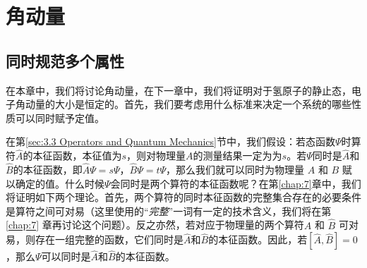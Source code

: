 \chapter{角动量}
\label{chap:5}
\section{同时规范多个属性}
\label{sec:5.1 Simultaneous Specification of Several Properties}
    在本章中，我们将讨论角动量，在下一章中，我们将证明对于氢原子的静止态，电子角动量的大小是恒定的。首先，我们要考虑用什么标准来决定一个系统的哪些性质可以同时赋予定值。

    在第\ref{sec:3.3 Operators and Quantum Mechanics}节中，我们假设：若态函数$\Psi$时算符$\hat{A}$的本征函数，本征值为$s$，则对物理量$A$的测量结果一定为为$s$。若$\Psi$同时是$\hat{A}$和$\hat{B}$的本征函数，即$\hat{A}\Psi=s\Psi$，$\hat{B}\Psi=t\Psi$，那么我们就可以同时为物理量 $A$ 和 $B$ 赋以确定的值。什么时候$\Psi$会同时是两个算符的本征函数呢？在第\ref{chap:7}章中，我们将证明如下两个理论。首先，两个算符的同时本征函数的完整集合存在的必要条件是算符之间可对易（这里使用的“\textit{完整}”一词有一定的技术含义，我们将在第 \ref{chap:7} 章再讨论这个问题）。反之亦然，若对应于物理量的两个算符$\hat{A}$ 和 $\hat{B}$ 可对易，则存在一组完整的函数，它们同时是$\hat{A}$和$\hat{B}$的本征函数。因此，若$\left[\hat{A},\hat{B}\right]=0$，那么$\Psi$可以同时是$\hat{A}$和$\hat{B}$的本征函数。

